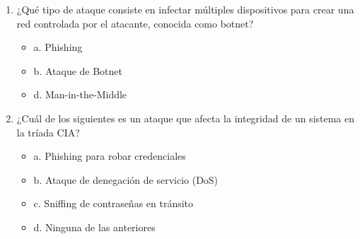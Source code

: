 \documentclass[a4paper]{article}
\begin{document}
\begin{enumerate}
    \item ¿Qué tipo de ataque consiste en infectar múltiples dispositivos para crear una red controlada por el atacante, conocida como botnet?
    \begin{itemize}
        \item a. Phishing
        \item b. Ataque de Botnet
        \item d. Man-in-the-Middle
    \end{itemize}


    \item ¿Cuál de los siguientes es un ataque que afecta la integridad de un sistema en la tríada CIA?
    \begin{itemize}
        \item a. Phishing para robar credenciales
        \item b. Ataque de denegación de servicio (DoS)
        \item c. Sniffing de contraseñas en tránsito
        \item d. Ninguna de las anteriores %
    \end{itemize}


\end{enumerate}
\end{document}
